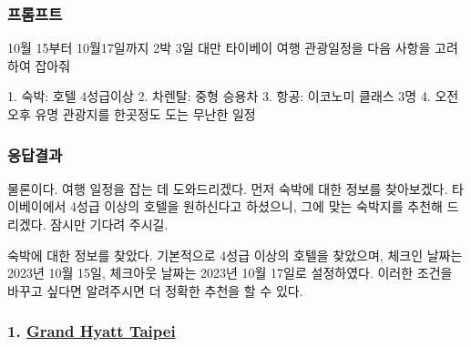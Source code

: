 \documentclass[
  letterpaper,
]{book}
\newenvironment{Shaded}{\begin{snugshade}}{\end{snugshade}}
\newcommand{\NormalTok}[1]{\textcolor[rgb]{0.00,0.23,0.31}{#1}}
\begin{document}
\begin{tcolorbox}[enhanced jigsaw, opacityback=0, opacitybacktitle=0.6, colback=white, rightrule=.15mm, coltitle=black, colframe=quarto-callout-note-color-frame, colbacktitle=quarto-callout-note-color!10!white, bottomrule=.15mm, bottomtitle=1mm, breakable, title=\textcolor{quarto-callout-note-color}{\faInfo}\hspace{0.5em}{여행개요 프롬프트와 응답결과}, titlerule=0mm, leftrule=.75mm, toptitle=1mm, left=2mm, arc=.35mm, toprule=.15mm]

\hypertarget{uxd504uxb86cuxd504uxd2b8-2}{%
\subsubsection*{프롬프트}\label{uxd504uxb86cuxd504uxd2b8-2}}

\begin{Shaded}
\begin{Highlighting}[]
\NormalTok{10월 15부터 10월17일까지 2박 3일 대만 타이베이 여행 관광일정을 다음 사항을 고려하여 잡아줘}

\NormalTok{1. 숙박: 호텔 4성급이상}
\NormalTok{2. 차렌탈: 중형 승용차}
\NormalTok{3. 항공: 이코노미 클래스 3명}
\NormalTok{4. 오전 오후 유명 관광지를 한곳정도 도는 무난한 일정}
\end{Highlighting}
\end{Shaded}

\hypertarget{uxc751uxb2f5uxacb0uxacfc}{%
\subsubsection*{응답결과}\label{uxc751uxb2f5uxacb0uxacfc}}

물론이다. 여행 일정을 잡는 데 도와드리겠다. 먼저 숙박에 대한 정보를
찾아보겠다. 타이베이에서 4성급 이상의 호텔을 원하신다고 하셨으니, 그에
맞는 숙박지를 추천해 드리겠다. 잠시만 기다려 주시길.

숙박에 대한 정보를 찾았다. 기본적으로 4성급 이상의 호텔을 찾았으며,
체크인 날짜는 2023년 10월 15일, 체크아웃 날짜는 2023년 10월 17일로
설정하였다. 이러한 조건을 바꾸고 싶다면 알려주시면 더 정확한 추천을 할
수 있다.

\hypertarget{grand-hyatt-taipei}{%
\subsubsection*{\texorpdfstring{1.
\href{https://apim.expedia.com/recommendations/og-redirect/97fe6b74-6c8b-4624-81e5-35ec312e25cd?brand=bex}{Grand
Hyatt Taipei}}{1. Grand Hyatt Taipei}}\label{grand-hyatt-taipei}}


\end{tcolorbox}
\end{document}
